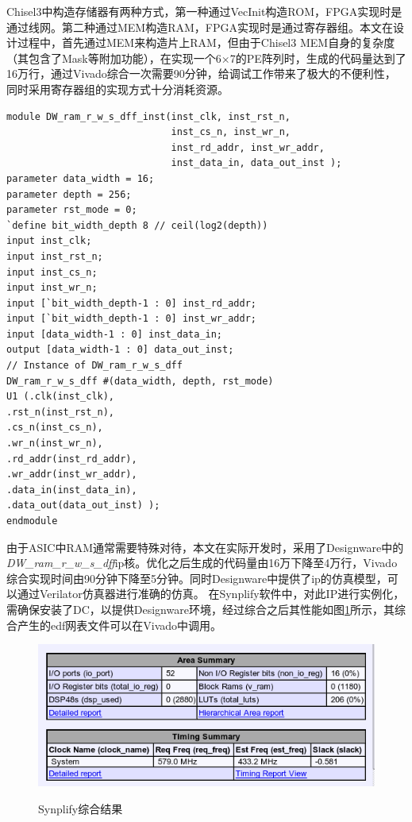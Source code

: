 Chisel3中构造存储器有两种方式，第一种通过VecInit构造ROM，FPGA实现时是通过线网。第二种通过MEM构造RAM，FPGA实现时是通过寄存器组。本文在设计过程中，首先通过MEM来构造片上RAM，但由于Chisel3 MEM自身的复杂度（其包含了Mask等附加功能），在实现一个6×7的PE阵列时，生成的代码量达到了16万行，通过Vivado综合一次需要90分钟，给调试工作带来了极大的不便利性，同时采用寄存器组的实现方式十分消耗资源。

        \begin{lstlisting}[title=DW\_ram\_r\_w\_s\_dff例化代码参考, frame=shadowbox]
module DW_ram_r_w_s_dff_inst(inst_clk, inst_rst_n,
                             inst_cs_n, inst_wr_n,
                             inst_rd_addr, inst_wr_addr, 
                             inst_data_in, data_out_inst );
parameter data_width = 16;
parameter depth = 256;
parameter rst_mode = 0;
`define bit_width_depth 8 // ceil(log2(depth))
input inst_clk;
input inst_rst_n;
input inst_cs_n;
input inst_wr_n;
input [`bit_width_depth-1 : 0] inst_rd_addr;
input [`bit_width_depth-1 : 0] inst_wr_addr;
input [data_width-1 : 0] inst_data_in;
output [data_width-1 : 0] data_out_inst;
// Instance of DW_ram_r_w_s_dff
DW_ram_r_w_s_dff #(data_width, depth, rst_mode)
U1 (.clk(inst_clk),
.rst_n(inst_rst_n),
.cs_n(inst_cs_n),
.wr_n(inst_wr_n),
.rd_addr(inst_rd_addr),
.wr_addr(inst_wr_addr),
.data_in(inst_data_in),
.data_out(data_out_inst) );
endmodule
        \end{lstlisting}

由于ASIC中RAM通常需要特殊对待，本文在实际开发时，采用了Designware中的\emph{DW\_ram\_r\_w\_s\_dff}ip核。优化之后生成的代码量由16万下降至4万行，Vivado综合实现时间由90分钟下降至5分钟。同时Designware中提供了ip的仿真模型，可以通过Verilator仿真器进行准确的仿真。
在Synplify软件中，对此IP进行实例化，需确保安装了DC，以提供Designware环境，经过综合之后其性能如图\ref{synplify}所示，其综合产生的edf网表文件可以在Vivado中调用。
\begin{figure}[h]
    \centering
    \includegraphics{../pdf/synplify.png}\\
    \caption{Synplify综合结果}
    \label{synplify}
\end{figure}

